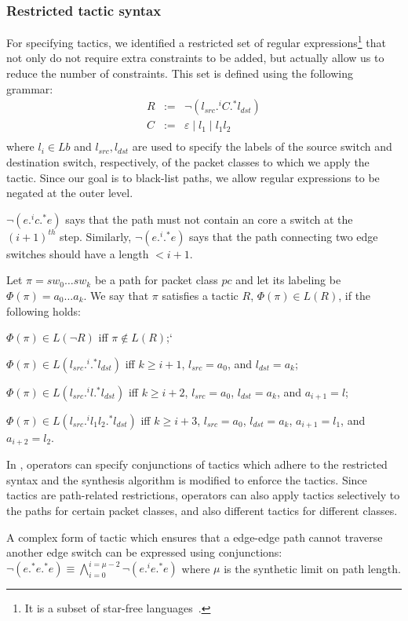 \subsubsection{Restricted tactic syntax} 
For specifying tactics, we identified a restricted set of regular expressions\footnote{
	It is a subset of star-free languages~\cite{starfree}.}
 that not only do not require extra constraints to be added,
but actually allow us to reduce the number of constraints. 
This set is defined using the following grammar:
$$\begin{array}{rcl}
R  &  :=  &  \neg (l_{src} .^i C .^* l_{dst}) \\
C  &  :=  &  \varepsilon \mid l_1 \mid l_1 l_2\\
\end{array}$$
where $l_i\in Lb$ and $l_{src}, l_{dst}$ are used to specify the labels of the source switch 
and destination switch, respectively, of the packet classes to which we apply the tactic. 
Since our goal is to black-list paths, we allow regular expressions to be negated at the outer level. 
\begin{example}
 $\neg (e .^i c .^* e)$ says that the path must not contain an core a switch at the $(i+1)^{th}$ step. 
 Similarly, $\neg (e .^i .^* e)$ says that the path connecting two edge switches should have a length $ < i + 1$. 
\end{example}


Let $\pi = sw_0\ldots sw_k$ be a path for packet class $pc$
and let its labeling be $\Phi(\pi)= a_0\ldots a_k$.
We say that $\pi$ satisfies a tactic $R$,  $\Phi(\pi) \in L(R)$, if the following
holds:
\begin{compact2itemize}
\item $\Phi(\pi) \in L(\neg R)$ iff $\pi \not\in L(R)$;`
\item $\Phi(\pi) \in L( l_{src} .^i .^* l_{dst})$ iff $k\geq i+1$, $l_{src}= a_0$, and $l_{dst}= a_k$; 
\item $\Phi(\pi)  \in L (l_{src} .^i l.^* l_{dst})$ iff $k\geq i+2$, $l_{src}= a_0$, $l_{dst}= a_k$, and $a_{i+1}=l$;
\item $\Phi(\pi)  \in L( l_{src} .^i l_1 l_2.^* l_{dst})$ iff $k\geq i+3$, $l_{src}= a_0$, $l_{dst}= a_k$, $a_{i+1}=l_1$, and $a_{i+2}=l_2$.
\end{compact2itemize}
In \Name, operators can specify conjunctions of tactics which adhere to the restricted 
syntax and the synthesis algorithm is modified to enforce the tactics. 
Since tactics are path-related restrictions, 
operators can also apply tactics selectively to the paths for certain packet classes, and also different tactics for different classes. 
\begin{example}
A complex form of tactic which ensures that a edge-edge path
cannot traverse another edge switch can be expressed using conjunctions:
$\neg (e .^* e .^* e)\equiv \bigwedge \limits_{i=0}^{i=\mu-2} \neg (e .^i e .^* e)$ where $\mu$ is the synthetic limit on path length. 
\end{example}


